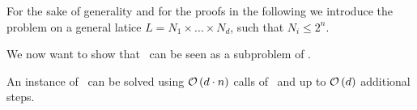For the sake of generality and for the proofs in the following we introduce the problem on a general latice $L = N_1 \times \dots \times N_d$, such that $N_i \leq 2^n$.

We now want to show that \Tarskistar\ can be seen as a subproblem of \Tarski.
\begin{claim}
    An instance of \Tarski\ can be solved using $\mathcal{O}\left(d\cdot n\right)$ calls of \Tarskistar\ and up to $\mathcal{O}\left(d\right)$ additional steps.
\end{claim}
